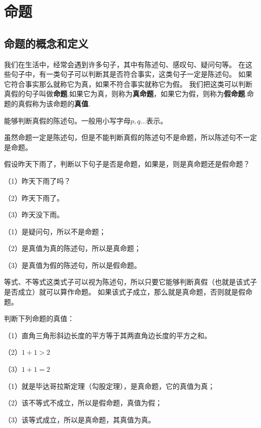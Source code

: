 \section{命题}
\subsection{命题的概念和定义}
我们在生活中，经常会遇到许多句子，其中有陈述句、感叹句、疑问句等。
在这些句子中，有一类句子可以判断其是否符合事实，这类句子一定是陈述句。
如果它符合事实那么就称它为真，如果不符合事实就称它为假。
我们把这类可以判断真假的句子叫做\textbf{命题}.如果它为真，则称为\textbf{真命题}，如果它为假，则称为\textbf{假命题}.命题的真假称为该命题的\textbf{真值}.

\begin{definition}[命题]
    能够判断真假的陈述句。一般用小写字母$p,q...$表示。
\end{definition}

虽然命题一定是陈述句，但是不能判断真假的陈述句不是命题，所以陈述句不一定是命题。

\begin{example}
    假设昨天下雨了，判断以下句子是否是命题，如果是，则是真命题还是假命题？

    （1）昨天下雨了吗？

    （2）昨天下雨了。
    
    （3）昨天没下雨。
\end{example}
\begin{solution}
    （1）是疑问句，所以不是命题；
    
    （2）是真值为真的陈述句，所以是真命题；

    （3）是真值为假的陈述句，所以是假命题。
\end{solution}

等式、不等式这类式子可以视为陈述句，所以只要它能够判断真假（也就是该式子是否成立）就可以算作命题。
如果该式子成立，那么就是真命题，否则就是假命题。

\begin{example}
    判断下列命题的真值：

    （1）直角三角形斜边长度的平方等于其两直角边长度的平方之和。
    
    （2）$1+1>2$

    （3）$1+1=2$
\end{example}
\begin{solution}
    （1）就是毕达哥拉斯定理（勾股定理），是真命题，它的真值为真；
    
    （2）该不等式不成立，所以是假命题，真值为假；
    
    （3）该等式成立，所以是真命题，其真值为真。
\end{solution}

